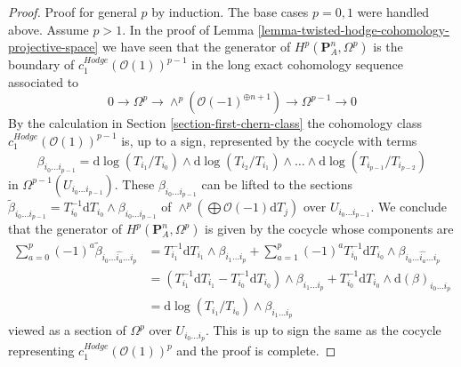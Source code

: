 \documentclass[10pt,a4paper]{amsart}
\theoremstyle{plain}
\theoremstyle{definition}
\theoremstyle{remark}
\numberwithin{equation}{subsection}
\begin{document}
\begin{proof}
\medskip\noindent
Proof for general $p$ by induction. The base cases $p = 0, 1$ were handled
above. Assume $p > 1$. In the proof of
Lemma \ref{lemma-twisted-hodge-cohomology-projective-space}
we have seen that the generator of $H^p(\mathbf{P}^n_A, \Omega^p)$
is the boundary of $c_1^{Hodge}(\mathcal{O}(1))^{p - 1}$
in the long exact cohomology sequence associated to
$$
0 \to \Omega^p \to \wedge^p\left(\mathcal{O}(-1)^{\oplus n + 1}\right)
\to \Omega^{p - 1} \to 0
$$
By the calculation in Section \ref{section-first-chern-class}
the cohomology class $c_1^{Hodge}(\mathcal{O}(1))^{p - 1}$
is, up to a sign, represented by the cocycle with terms
$$
\beta_{i_0 \ldots i_{p - 1}} =
\text{d}\log(T_{i_1}/T_{i_0}) \wedge
\text{d}\log(T_{i_2}/T_{i_1}) \wedge \ldots \wedge
\text{d}\log(T_{i_{p - 1}}/T_{i_{p - 2}})
$$
in $\Omega^{p - 1}(U_{i_0 \ldots i_{p - 1}})$. These
$\beta_{i_0 \ldots i_{p - 1}}$ can be lifted to the sections
$\tilde \beta_{i_0 \ldots i_{p -1}} =
T_{i_0}^{-1}\text{d}T_{i_0} \wedge \beta_{i_0 \ldots i_{p - 1}}$
of $\wedge^p(\bigoplus \mathcal{O}(-1) \text{d}T_j)$ over
$U_{i_0 \ldots i_{p - 1}}$. We conclude that the generator of
$H^p(\mathbf{P}^n_A, \Omega^p)$ is given by the cocycle whose
components are
\begin{align*}
\sum\nolimits_{a = 0}^p (-1)^a
\tilde \beta_{i_0 \ldots \hat{i_a} \ldots i_p}
& =
T_{i_1}^{-1}\text{d}T_{i_1} \wedge \beta_{i_1 \ldots i_p}
+ \sum\nolimits_{a = 1}^p (-1)^a
T_{i_0}^{-1}\text{d}T_{i_0} \wedge
\beta_{i_0 \ldots \hat{i_a} \ldots i_p} \\
& =
(T_{i_1}^{-1}\text{d}T_{i_1} - T_{i_0}^{-1}\text{d}T_{i_0}) \wedge
\beta_{i_1 \ldots i_p} +
T_{i_0}^{-1}\text{d}T_{i_0} \wedge \text{d}(\beta)_{i_0 \ldots i_p} \\
& =
\text{d}\log(T_{i_1}/T_{i_0}) \wedge \beta_{i_1 \ldots i_p}
\end{align*}
viewed as a section of $\Omega^p$ over $U_{i_0 \ldots i_p}$.
This is up to sign the same as the cocycle representing
$c_1^{Hodge}(\mathcal{O}(1))^p$ and the proof is complete.
\end{proof}
\end{document}

